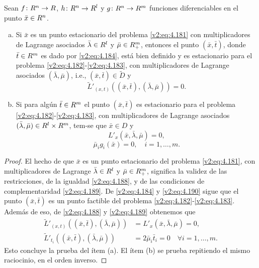 \begin{lemma}\label{v2:lem:4.5.1}
    Sean $f \colon R^n \to R$, $h \colon R^n \to R^l$ y $g \colon R^n \to R^m$ funciones diferenciables en el punto $\bar{x} \in R^n$.
    \begin{enumerate}[(a)]
        \item Si $\bar{x}$ es un punto estacionario del problema \eqref{v2:eq:4.181} con multiplicadores de Lagrange asociados $\bar{\lambda} \in R^l$ y $\bar{\mu} \in R^m_+$, entonces el punto $(\bar{x}, \bar{t})$, donde $\bar{t} \in R^m$ es dado por \eqref{v2:eq:4.184}, está bien definido y es estacionario para el problema \eqref{v2:eq:4.182}-\eqref{v2:eq:4.183}, con multiplicadores de Lagrange asociados $(\bar{\lambda}, \bar{\mu})$, i.e., $(\bar{x}, \bar{t}) \in \tilde{D}$ y
        \[
            \tilde{L}'_{(x,t)}((\bar{x}, \bar{t}), (\bar{\lambda}, \bar{\mu})) = 0.
        \]
        \item Si para algún $\bar{t} \in R^m$ el punto $(\bar{x}, \bar{t})$ es estacionario para el problema \eqref{v2:eq:4.182}-\eqref{v2:eq:4.183}, con multiplicadores de Lagrange asociados $(\bar{\lambda}, \bar{\mu}) \in R^l \times R^m$, tem-se que $\bar{x} \in D$ y
        \begin{equation}
            L'_x(\bar{x}, \bar{\lambda}, \bar{\mu}) = 0,
            \label{v2:eq:4.188}
        \end{equation}
        \begin{equation}
            \bar{\mu}_i g_i(\bar{x}) = 0, \quad i = 1, \dots, m.
            \label{v2:eq:4.189}
        \end{equation}
    \end{enumerate}
\end{lemma}
\begin{proof}
    El hecho de que $\bar{x}$ es un punto estacionario del problema \eqref{v2:eq:4.181}, con multiplicadores de Lagrange $\bar{\lambda} \in R^l$ y $\bar{\mu} \in R^m_+$, significa la validez de las restricciones, de la igualdad \eqref{v2:eq:4.188}, y de las condiciones de complementaridad \eqref{v2:eq:4.189}. De \eqref{v2:eq:4.184} y \eqref{v2:eq:4.190} sigue que el punto $(\bar{x}, \bar{t})$ es un punto factible del problema \eqref{v2:eq:4.182}-\eqref{v2:eq:4.183}. Además de eso, de \eqref{v2:eq:4.188} y \eqref{v2:eq:4.189} obtenemos que
    \begin{align*}
        \tilde{L}'_{(x,t)}((\bar{x}, \bar{t}), (\bar{\lambda}, \bar{\mu})) &= L'_x(\bar{x}, \bar{\lambda}, \bar{\mu}) = 0, \\
        \tilde{L}'_{t_i}((\bar{x}, \bar{t}), (\bar{\lambda}, \bar{\mu})) &= 2\bar{\mu}_i \bar{t}_i = 0 \quad \forall i = 1, \dots, m.
    \end{align*}
    Esto concluye la prueba del ítem (a).
    El ítem (b) se prueba repitiendo el mismo raciocinio, en el orden inverso.
\end{proof}

